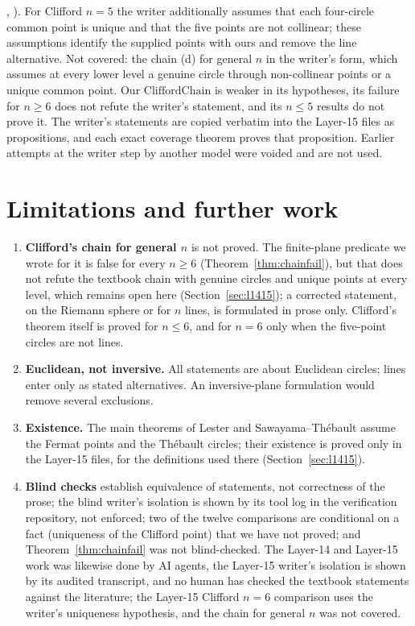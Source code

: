 \documentclass[11pt]{article}
\theoremstyle{definition}
\theoremstyle{remark}
\begin{document}
, ). For Clifford $n=5$ the
writer additionally assumes that each four-circle common point is unique and that the five points are
not collinear; these assumptions identify the supplied points with ours and remove the line alternative.
Not covered: the chain (d) for
general $n$ in the writer's form, which assumes at every lower level a genuine circle through
non-collinear points or a unique common point. Our $\mathrm{CliffordChain}$ is weaker in its hypotheses,
its failure for $n\ge6$ does not refute the writer's statement, and its $n\le5$ results do not prove it.
The writer's statements are copied verbatim into the Layer-15 files as propositions, and each exact
coverage theorem proves that proposition. Earlier attempts at the writer step by another model were
voided and are not used.

\section{Limitations and further work}\label{sec:limits}
\begin{enumerate}
\item \textbf{Clifford's chain for general $n$} is not proved. The finite-plane predicate we wrote for it
is false for every $n\ge6$ (Theorem~\ref{thm:chainfail}), but that does not refute the textbook chain
with genuine circles and unique points at every level, which remains open here (Section~\ref{sec:l1415});
a corrected statement, on the Riemann sphere
or for $n$ lines, is formulated in prose only. Clifford's theorem itself is proved for $n\le6$, and for
$n=6$ only when the five-point circles are not lines.
\item \textbf{Euclidean, not inversive.} All statements are about Euclidean circles; lines enter only
as stated alternatives. An inversive-plane formulation would remove several exclusions.
\item \textbf{Existence.} The main theorems of Lester and Sawayama--Th\'ebault assume the Fermat points and the Th\'ebault
circles; their existence is proved only in the Layer-15 files, for the definitions used there
(Section~\ref{sec:l1415}).
\item \textbf{Blind checks} establish equivalence of statements, not correctness of the prose; the
blind writer's isolation is shown by its tool log in the verification repository, not enforced; two of the twelve comparisons are
conditional on a fact (uniqueness of the Clifford point) that we have not proved; and
Theorem~\ref{thm:chainfail} was not blind-checked. The Layer-14 and Layer-15 work was likewise done by AI
agents, the Layer-15 writer's isolation is shown by its audited transcript, and no human has checked the
textbook statements against the literature; the Layer-15 Clifford $n=6$ comparison uses the writer's
uniqueness hypothesis, and the chain for general $n$ was not covered.
\end{enumerate}
\end{document}
